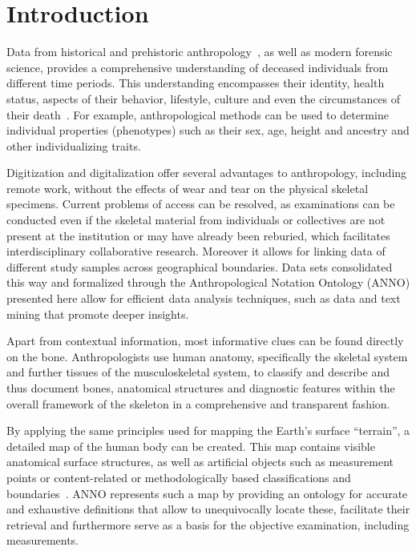 \documentclass[sw]{iosart2x}
\begin{document}
\section{Introduction}\label{sec:introduction}

Data from historical and prehistoric anthropology~\citep{prehistoricanthropology}, as well as modern forensic science, provides a comprehensive understanding of deceased individuals from different time periods.
This understanding encompasses their identity, health status, aspects of their behavior, lifestyle, culture and even the circumstances of their death~\citep{spurensuche}.
For example, anthropological methods can be used to determine individual properties (phenotypes) such as their sex, age, height and ancestry and other individualizing traits.

Digitization and digitalization offer several advantages to anthropology, including remote work, without the effects of wear and tear on the physical skeletal specimens.
Current problems of access can be resolved, as examinations can be conducted even if the skeletal material from individuals or collectives are not present at the institution or may have already been reburied, which facilitates interdisciplinary collaborative research.
Moreover it allows for linking data of different study samples across geographical boundaries.
Data sets consolidated this way and formalized through the Anthropological Notation Ontology (ANNO) presented here allow for efficient data analysis techniques, such as data and text mining that promote deeper insights.

Apart from contextual information, most informative clues can be found directly on the bone.
Anthropologists use human anatomy, specifically the skeletal system and further tissues of the musculoskeletal system, to classify and describe and thus document bones, anatomical structures and diagnostic features within the overall framework of the skeleton in a comprehensive and transparent fashion.

By applying the same principles used for mapping the Earth's surface \enquote{terrain}, a detailed map of the human body can be created.
This map contains visible anatomical surface structures, as well as artificial objects such as measurement points or content-related or methodologically based classifications and boundaries~\citep{topo}.
ANNO represents such a map by providing an ontology for accurate and exhaustive definitions that allow to unequivocally locate these, facilitate their retrieval and furthermore serve as a basis for the objective examination, including measurements.
\end{document}

